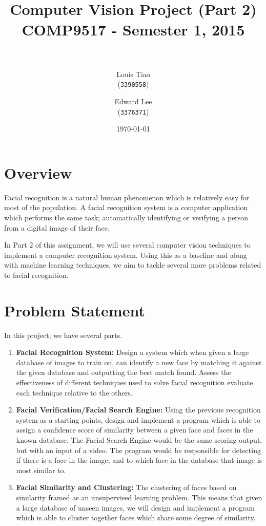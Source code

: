 \documentclass[11pt]{article} %
\title{	
\normalfont \normalsize 
\horrule{0.5pt} \\[0.4cm] %
\Large Computer Vision Project (Part 2) \\ [0.1cm] %
\large COMP9517 - Semester 1, 2015 \\ [0.2cm]
\horrule{2pt} \\[0.5cm] %
}
\author{
	Louis Tiao \\
	(\texttt{3390558})
	\and
	Edward Lee\\
	(\texttt{3376371})
} %
\date{\normalsize\today} %
\theoremstyle{plain}
\theoremstyle{definition}
\theoremstyle{remark}
\numberwithin{equation}{section} %
\numberwithin{figure}{section} %
\numberwithin{table}{section} %
\begin{document}
\maketitle %

\section{Overview}

Facial recognition is a natural human phenomenon which is relatively easy for most of the population. A facial recognition system is a computer application which performs the same task; automatically identifying or verifying a person from a digital image of their face.

In Part 2 of this assignment, we will use several computer vision techniques to implement a computer recognition system. Using this as a baseline and along with machine learning techniques, we aim to tackle several more problems related to facial recognition.

\section{Problem Statement}

In this project, we have several parts.


\begin{enumerate}
  \item \textbf{Facial Recognition System:} Design a system which when given a large database of images to train on, can identify a new face by matching it against the given database and outputting the best match found. Assess the effectiveness of different techniques used to solve facial recognition evaluate each technique relative to the others.
  \item \textbf{Facial Verification/Facial Search Engine:} Using the previous recognition system as a starting points, design and implement a program which is able to assign a confidence score of similarity between a given face and faces in the known database. The Facial Search Engine would be the same scoring output, but with an input of a video. The program would be responsible for detecting if there is a face in the image, and to which face in the database that image is most similar to.
  \item \textbf{Facial Similarity and Clustering:} The clustering of faces based on similarity framed as an unsupervised learning problem. This means that given a large database of unseen images, we will design and implement a program which is able to cluster together faces which share some degree of similarity.
\end{enumerate}
\end{document}
